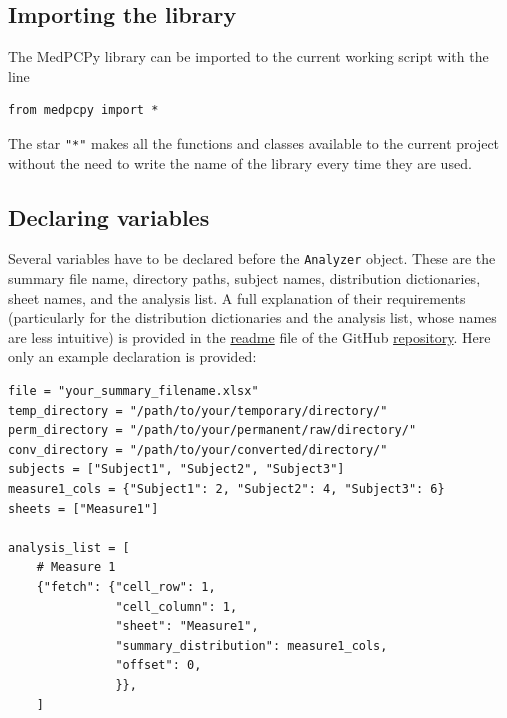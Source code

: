 \documentclass[a4paper,12pt]{article}
\begin{document}
\subsection{Importing the library}

The MedPCPy library can be imported to the current working script with the line

\begin{tcolorbox}[
    enhanced,
    attach boxed title to top left={xshift=6mm,yshift=-3mm},
    colback=lightgreen!20,
    colframe=lightgreen,
    colbacktitle=lightgreen,
    title=Python,
    fonttitle=\bfseries\color{black},
    boxed title style={size=small,colframe=lightgreen,sharp corners},
    sharp corners,
    ]
    \begin{verbatim}
from medpcpy import *
    \end{verbatim}
\end{tcolorbox}

The star \verb|"*"| makes all the functions and classes available to the current project without the need to write the name of the library every time they are used.

\subsection{Declaring variables}

Several variables have to be declared before the \verb|Analyzer| object. These are the summary file name, directory paths, subject names, distribution dictionaries, sheet names, and the analysis list. A full explanation of their requirements (particularly for the distribution dictionaries and the analysis list, whose names are less intuitive) is provided in the \href{https://github.com/JuodaanViinaa/Laboratorio/blob/translate/README.md}{readme} file of the GitHub \href{https://github.com/JuodaanViinaa/Laboratorio/tree/translate}{repository}. Here only an example declaration is provided:

\begin{tcolorbox}[
    enhanced,
    attach boxed title to top left={xshift=6mm,yshift=-3mm},
    colback=lightgreen!20,
    colframe=lightgreen,
    colbacktitle=lightgreen,
    title=Python,
    fonttitle=\bfseries\color{black},
    boxed title style={size=small,colframe=lightgreen,sharp corners},
    sharp corners,
    ]
    \begin{verbatim}
file = "your_summary_filename.xlsx"
temp_directory = "/path/to/your/temporary/directory/"
perm_directory = "/path/to/your/permanent/raw/directory/"
conv_directory = "/path/to/your/converted/directory/"
subjects = ["Subject1", "Subject2", "Subject3"]
measure1_cols = {"Subject1": 2, "Subject2": 4, "Subject3": 6}
sheets = ["Measure1"]

analysis_list = [
    # Measure 1
    {"fetch": {"cell_row": 1,
               "cell_column": 1,
               "sheet": "Measure1",
               "summary_distribution": measure1_cols,
               "offset": 0,
               }},
    ]
    \end{verbatim}
\end{tcolorbox}
\end{document}
